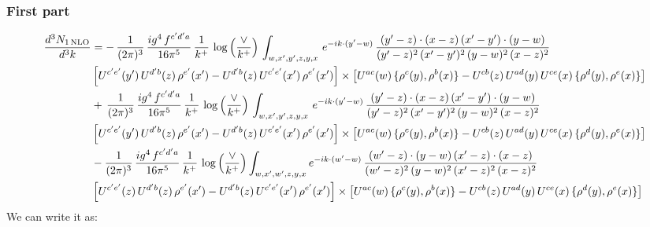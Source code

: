 \documentclass[9pt]{article}
\numberwithin{equation}{section}
\begin{document}
 \subsubsection{First part}
\begin{align}
     \frac{d^{3}N_{1\,\rm NLO}}{d^{3}k} & =   -\,\frac{1}{(2\pi)^{3}}\, \frac{ig^{4}\,f^{c'd'a}}{16\pi^{5}}\, \frac{1}{k^{+}}\,\log{\left(\frac{\vee}{k^{+}}\right)}\, \int_{w,x',y',z,y,x}\, e^{-ik\cdot (y'-w)}\,\frac{(y'-z)\cdot (x-z)\,(x'-y')\cdot (y-w)}{(y'-z)^{2}\,(x'-y')^{2}\,(y-w)^{2}\,(x-z)^{2}}\notag \\ &  \left[U^{c'e'}(y')\,U^{d'b}(z)\,\rho^{e'}(x')-U^{d'b}(z)\,U^{c'e'}(x')\,\rho^{e'}(x')\right]\times  \left[U^{ac}(w)\, \{\rho^{c}(y),\rho^{b}(x)\}-U^{cb}(z)\,U^{ad}(y)\,U^{ce}(x)\,\{\rho^{d}(y),\rho^{e}(x)\}\right] \notag \\
&   +\,\frac{1}{(2\pi)^{3}}\, \frac{ig^{4}\,f^{c'd'a}}{16\pi^{5}}\, \frac{1}{k^{+}}\,\log{\left(\frac{\vee}{k^{+}}\right)}\, \int_{w,x',y',z,y,x}\, e^{-ik\cdot (y'-w)}\,\frac{(y'-z)\cdot (x-z)\,(x'-y')\cdot (y-w)}{(y'-z)^{2}\,(x'-y')^{2}\,(y-w)^{2}\,(x-z)^{2}}\notag \\ &    \left[U^{c'e'}(y')\,U^{d'b}(z)\,\rho^{e'}(x')-U^{d'b}(z)\,U^{c'e'}(x')\,\rho^{e'}(x')\right]\times  \left[U^{ac}(w)\, \{\rho^{c}(y),\rho^{b}(x)\}-U^{cb}(z)\,U^{ad}(y)\,U^{ce}(x)\,\{\rho^{d}(y),\rho^{e}(x)\}\right] \notag \\
&   -\frac{1}{(2\pi)^{3}}\, \frac{ig^{4}\,f^{c'd'a}}{16\pi^{5}}\, \frac{1}{k^{+}}\,\log{\left(\frac{\vee}{k^{+}}\right)}\int_{w,x',w',z,y,x} e^{-ik\cdot (w'-w)}\,\frac{(w'-z)\cdot (y-w)\,(x'-z)\cdot (x-z)}{(w'-z)^{2}\,(y-w)^{2}\,(x'-z)^{2}\,(x-z)^{2}}\notag \\
&   \left[U^{c'e'}(z)\,U^{d'b}(z)\,\rho^{e'}(x')-U^{d'b}(z)\,U^{c'e'}(x')\,\rho^{e'}(x')\right]  \times\left[U^{ac}(w)\, \{\rho^{c}(y),\rho^{b}(x)\}-U^{cb}(z)\,U^{ad}(y)\,U^{ce}(x)\,\{\rho^{d}(y),\rho^{e}(x)\}\right]
\end{align}
We can write it as: 
\end{document}
